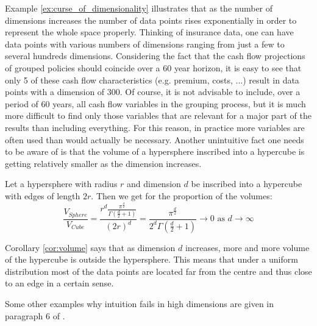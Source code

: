 Example \ref{ex:curse_of_dimensionality} illustrates that as the number of dimensions increases the number of data points rises exponentially in order to represent the whole space properly. Thinking of insurance data, one can have data points with various numbers of dimensions ranging from just a few to several hundreds dimensions. Considering the fact that the cash flow projections of grouped policies should coincide over a 60 year horizon, it is easy to see that only 5 of these cash flow characteristics (e.g. premium, costs, ...)  result in data points with a dimension of 300. Of course, it is not advisable to include, over a period of 60 years, all cash flow variables in the grouping process, but it is much more difficult to find only those variables that are relevant for a major part of the results than including everything. For this reason, in practice more variables are often used than would actually be necessary. Another unintuitive fact one needs to be aware of is that the volume of a hypersphere inscribed into a hypercube is getting relatively smaller as the dimension increases. 

\begin{corollary}\label{cor:volume}
Let a hypersphere with radius $r$ and dimension $d$ be inscribed into a hypercube with edges of length $2r$. Then we get for the proportion of the volumes:
	\begin{equation*}
		\frac{V_{Sphere}}{V_{Cube}} =\frac{r^d\frac{\pi^{\frac{d}{2}}}{\Gamma(\frac{d}{2}+1)}}{(2r)^d} =\frac{\pi^{\frac{d}{2}}}{2^d\Gamma(\frac{d}{2}+1)} \rightarrow 0 \text{ as } d \rightarrow \infty
	\end{equation*}
\end{corollary}

\begin{remark}
Corollary \ref{cor:volume}  says that as dimension $d$ increases, more and more volume of the hypercube is outside the hypersphere. This means that under a uniform distribution most of the data points are located far from the centre and thus close to an edge in a certain sense. 
\end{remark}

\begin{remark}
Some other examples why intuition fails in high dimensions are given in paragraph 6 of \cite{domingos2012few}.
\end{remark}

